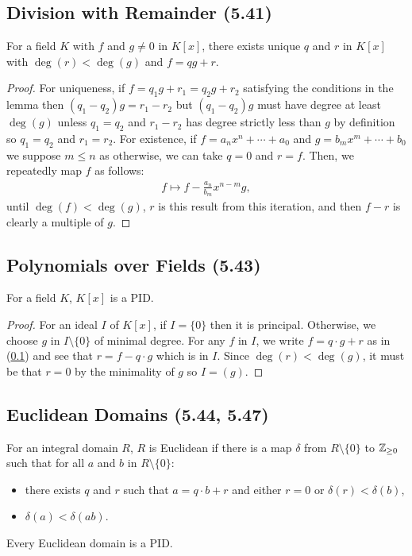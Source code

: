 \subsection{Division with Remainder (5.41)} \label{5.41}

For a field $K$ with $f$ and $g \neq 0$ in $K[x]$, there exists unique
$q$ and $r$ in $K[x]$ with $\deg(r) < \deg(g)$ and $f = qg + r$.

\begin{proof}
    For uniqueness, if $f = q_1g + r_1 = q_2g + r_2$ satisfying the
    conditions in the lemma then $(q_1 - q_2)g = r_1 - r_2$ but
    $(q_1 - q_2)g$ must have degree at least $\deg(g)$ unless $q_1 = q_2$
    and $r_1 - r_2$ has degree strictly less than $g$ by definition
    so $q_1 = q_2$ and $r_1 = r_2$.
    \bs
    For existence, if $f = a_nx^n + \cdots + a_0$ and 
    $g = b_mx^m + \cdots + b_0$ we suppose $m \leq n$
    as otherwise, we can take $q = 0$ and $r = f$.
    Then, we repeatedly map $f$ as follows: \begin{align*}
        f \mapsto f - \frac{a_n}{b_m}x^{n - m}g,
    \end{align*} until $\deg(f) < \deg(g)$, $r$ is this result from
    this iteration, and then $f - r$ is clearly a multiple of $g$.
\end{proof}

\subsection{Polynomials over Fields (5.43)} \label{5.43}

For a field $K$, $K[x]$ is a PID.

\begin{proof}
    For an ideal $I$ of $K[x]$, if $I = \{0\}$ then it is principal. Otherwise, we choose
    $g$ in $I \setminus \{0\}$ of minimal degree. For any $f$ in $I$, we write
    $f = q \cdot g + r$ as in (\ref{5.41}) and see that $r = f - q \cdot g$ which
    is in $I$. Since $\deg(r) < \deg(g)$, it must be that $r = 0$ by the minimality
    of $g$ so $I = (g)$.
\end{proof}

\subsection{Euclidean Domains (5.44, 5.47)} \label{5.44} \label{5.47}

For an integral domain $R$, $R$ is Euclidean if there is a map $\delta$ from
$R \setminus \{0\}$ to $\mathbb{Z}_{\geq 0}$ such that for all $a$ and $b$
in $R \setminus \{0\}$: \begin{itemize}
    \item there exists $q$ and $r$ such that $a = q \cdot b + r$ and either
        $r = 0$ or $\delta(r) < \delta(b)$,
    \item $\delta(a) < \delta(ab)$.
\end{itemize} Every Euclidean domain is a PID.

